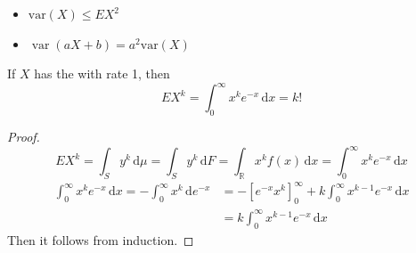 \documentclass[../main.tex]{subfiles}
\begin{document}
\begin{proposition}{}{}
    \begin{itemize}
        \item   \(  \mathrm{var}\left( X \right)\le EX^{2} \)
    \item \(\operatorname{var}\left( aX+ b \right)= a^{2}\mathrm{var}\left( X \right) \)
    \end{itemize}
    
\end{proposition}

\begin{example}{}{}
    If \(  X  \) has the  with rate 1, then \[
    EX^{k}= \int_{0}^{\infty}x^{k}e^{-x}\,\mathrm{d} x= k!
    \] 
\end{example}
\begin{proof}
    \[
    EX^{k}= \int_{S}y^{k}\,\mathrm{d} \mu =  \int_{S}y^{k}\,\mathrm{d} F= \int_{\mathbb{R} }x^{k}f\left( x \right)\,\mathrm{d} x=  \int_{0}^{\infty}x^{k} e^{-x}\,\mathrm{d} x
    \]   \[
    \begin{aligned}
    \int_{0}^{\infty}x^{k}e^{-x}\,\mathrm{d} x=  -\int_{0}^{\infty}x^{k}\,\mathrm{d} e^{-x}&= -\left[ e^{-x}x^{k} \right] _{0}^{\infty}+  k \int_{0}^{\infty}x^{k-1}e^{-x}\,\mathrm{d} x \\ 
     &=  k \int_{0}^{\infty}x^{k-1}e^{-x}\,\mathrm{d} x
    \end{aligned}
    \] Then it follows from induction.
\end{proof}
\end{document}
